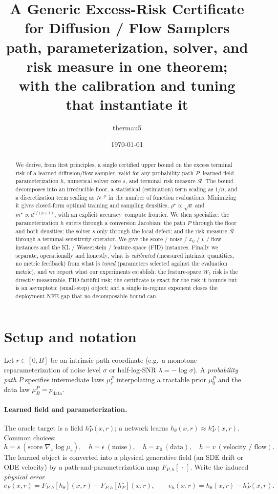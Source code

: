 \documentclass[11pt]{article}
\title{A Generic Excess-Risk Certificate for Diffusion / Flow Samplers\\
       {\large path, parameterization, solver, and risk measure in one theorem;\\
        with the calibration and tuning that instantiate it}}
\author{thermau5}
\date{\today}
\newcommand{\R}{\mathcal R}
\begin{document}
\maketitle

\begin{abstract}
We derive, from first principles, a single certified upper bound on the
excess terminal risk of a learned diffusion/flow sampler, valid for any
probability path $P$, learned-field parameterization $h$, numerical
solver core $s$, and terminal risk measure $\R$. The bound decomposes
into an irreducible floor, a statistical (estimation) term scaling as
$1/n$, and a discretization term scaling as $N^{-p}$ in the number of
function evaluations. Minimizing it gives closed-form optimal training
and sampling densities, $\rho^\star\propto\sqrt{a}$ and
$m^\star\propto d^{1/(p+1)}$, with an explicit accuracy--compute
frontier. We then specialize: the parameterization $h$ enters through a
conversion Jacobian; the path $P$ through the floor and both densities;
the solver $s$ only through the local defect; and the risk measure $\R$
through a terminal-sensitivity operator. We give the score / noise /
$x_0$ / $v$ / flow instances and the KL / Wasserstein / feature-space
(FID) instances. Finally we separate, operationally and honestly, what
is \emph{calibrated} (measured intrinsic quantities, no metric feedback)
from what is \emph{tuned} (parameters selected against the evaluation
metric), and we report what our experiments establish: the feature-space
$W_2$ risk is the directly-measurable, FID-faithful risk; the certificate
is exact for the risk it bounds but is an asymptotic (small-step) object;
and a single in-regime exponent closes the deployment-NFE gap that no
decomposable bound can.
\end{abstract}

\tableofcontents

\section{Setup and notation}
\label{sec:setup}

Let $r\in[0,B]$ be an intrinsic path coordinate (e.g.\ a monotone
reparameterization of noise level $\sigma$ or half-log-SNR
$\lambda=-\log\sigma$). A \emph{probability path} $P$ specifies
intermediate laws $\mu_r^P$ interpolating a tractable prior $\mu_0^P$ and
the data law $\mu_B^P=p_{\mathrm{data}}$.

\paragraph{Learned field and parameterization.}
The oracle target is a field $h_P^\star(x,r)$; a network learns
$h_\theta(x,r)\approx h_P^\star(x,r)$. Common choices:
\[
h=s\ (\text{score }\nabla_x\log\mu_r),\quad
h=\epsilon\ (\text{noise}),\quad
h=x_0\ (\text{data}),\quad
h=v\ (\text{velocity / flow}).
\]
The learned object is converted into a physical generative field
(an SDE drift or ODE velocity) by a path-and-parameterization map
$F_{P,h}[\,\cdot\,]$. Write the induced \emph{physical error}
\[
e_F(x,r)=F_{P,h}[h_\theta](x,r)-F_{P,h}[h_P^\star](x,r),
\qquad
e_h(x,r)=h_\theta(x,r)-h_P^\star(x,r).
\]
\end{document}

